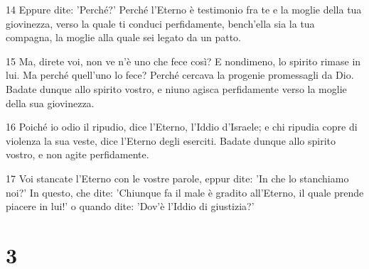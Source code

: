 \par 14 Eppure dite: 'Perché?' Perché l'Eterno è testimonio fra te e la moglie della tua giovinezza, verso la quale ti conduci perfidamente, bench'ella sia la tua compagna, la moglie alla quale sei legato da un patto.
\par 15 Ma, direte voi, non ve n'è uno che fece così? E nondimeno, lo spirito rimase in lui. Ma perché quell'uno lo fece? Perché cercava la progenie promessagli da Dio. Badate dunque allo spirito vostro, e niuno agisca perfidamente verso la moglie della sua giovinezza.
\par 16 Poiché io odio il ripudio, dice l'Eterno, l'Iddio d'Israele; e chi ripudia copre di violenza la sua veste, dice l'Eterno degli eserciti. Badate dunque allo spirito vostro, e non agite perfidamente.
\par 17 Voi stancate l'Eterno con le vostre parole, eppur dite: 'In che lo stanchiamo noi?' In questo, che dite: 'Chiunque fa il male è gradito all'Eterno, il quale prende piacere in lui!' o quando dite: 'Dov'è l'Iddio di giustizia?'

\chapter{3}

